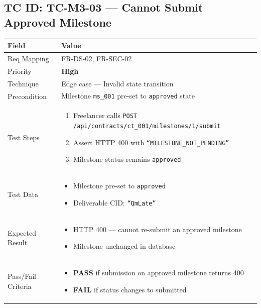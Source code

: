 \documentclass[12pt,a4paper]{article}
\newcommand{\sevhigh}{\textcolor{severityhigh}{\textbf{High}}}
\newcommand{\passresult}{\textcolor{passgreen}{\textbf{PASS}}}
\newcommand{\failresult}{\textcolor{failred}{\textbf{FAIL}}}
\begin{document}
\vspace{0.8cm}

\subsection{TC ID: TC-M3-03 --- Cannot Submit Approved Milestone}

\begin{tabular}{|p{}|p{}|}
\hline
\rowcolor{lightblue} \textbf{Field} & \textbf{Value} \\
\hline
Req Mapping & FR-DS-02, FR-SEC-02 \\
\hline
Priority & \sevhigh \\
\hline
Technique & Edge case --- Invalid state transition \\
\hline
Precondition & Milestone \texttt{ms\_001} pre-set to \texttt{approved} state \\
\hline
Test Steps &
\begin{enumerate}[nosep, leftmargin=*]
  \item Freelancer calls \texttt{POST /api/contracts/ct\_001/milestones/1/submit}
  \item Assert HTTP 400 with \texttt{``MILESTONE\_NOT\_PENDING''}
  \item Milestone status remains \texttt{approved}
\end{enumerate} \\
\hline
Test Data &
\begin{itemize}[nosep, leftmargin=*]
  \item Milestone pre-set to \texttt{approved}
  \item Deliverable CID: \texttt{``QmLate''}
\end{itemize} \\
\hline
Expected Result &
\begin{itemize}[nosep, leftmargin=*]
  \item HTTP 400 --- cannot re-submit an approved milestone
  \item Milestone unchanged in database
\end{itemize} \\
\hline
Pass/Fail Criteria &
\begin{itemize}[nosep, leftmargin=*]
  \item \passresult{} if submission on approved milestone returns 400
  \item \failresult{} if status changes to submitted
\end{itemize} \\
\hline
\end{tabular}
\end{document}
